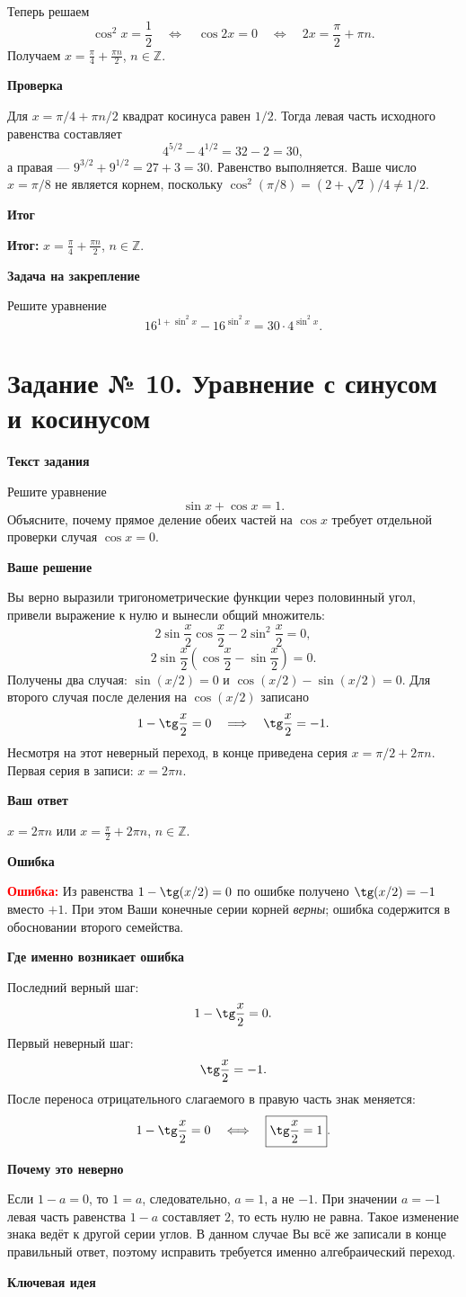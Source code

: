 \documentclass[12pt,a4paper]{article}
\newcommand{\heading}[1]{\par\vspace{4pt}\textbf{#1}\par}
\newcommand{\err}{\textcolor{red}{\textbf{Ошибка:}}}
\newcommand{\result}{\textcolor{teal!60!black}{\textbf{Итог:}}}
\begin{document}
Теперь решаем
\[
\cos^2x=\frac12
\quad\Longleftrightarrow\quad
\cos2x=0
\quad\Longleftrightarrow\quad
2x=\frac\pi2+\pi n.
\]
Получаем $\displaystyle x=\frac\pi4+\frac{\pi n}{2}$, $n\in\mathbb Z$.
\heading{Проверка}
Для $x=\pi/4+\pi n/2$ квадрат косинуса равен $1/2$. Тогда левая часть исходного равенства составляет
\[
4^{5/2}-4^{1/2}=32-2=30,
\]
а правая --- $9^{3/2}+9^{1/2}=27+3=30$. Равенство выполняется.
Ваше число $x=\pi/8$ не является корнем, поскольку $\cos^2(\pi/8)=(2+\sqrt2)/4\ne1/2$.
\heading{Итог}
\result{} $\displaystyle x=\frac\pi4+\frac{\pi n}{2}$, $n\in\mathbb Z$.
\heading{Задача на закрепление}
Решите уравнение
\[
16^{1+\sin^2x}-16^{\sin^2x}=30\cdot4^{\sin^2x}.
\]
\newpage
{}\label{task:10}
\section*{Задание № 10. Уравнение с синусом и косинусом}
\heading{Текст задания}
Решите уравнение
\[
\sin x+\cos x=1.
\]
Объясните, почему прямое деление обеих частей на $\cos x$ требует отдельной проверки случая $\cos x=0$.
\heading{Ваше решение}
Вы верно выразили тригонометрические функции через половинный угол, привели выражение к нулю и вынесли общий множитель:
\[
2\sin\frac x2\cos\frac x2-2\sin^2\frac x2=0,
\]
\[
2\sin\frac x2\left(\cos\frac x2-\sin\frac x2\right)=0.
\]
Получены два случая: $\sin(x/2)=0$ и $\cos(x/2)-\sin(x/2)=0$. Для второго случая после деления на $\cos(x/2)$ записано
\[
1-\tg\frac x2=0
\quad\Longrightarrow\quad
\tg\frac x2=-1.
\]
Несмотря на этот неверный переход, в конце приведена серия $x=\pi/2+2\pi n$. Первая серия в записи: $x=2\pi n$.
\heading{Ваш ответ}
$\displaystyle x=2\pi n$ или $\displaystyle x=\frac\pi2+2\pi n$, $n\in\mathbb Z$.
\heading{Ошибка}
\err{} Из равенства $1-\tg(x/2)=0$ по ошибке получено $\tg(x/2)=-1$ вместо $+1$. При этом Ваши конечные серии корней \emph{верны}; ошибка содержится в обосновании второго семейства.
\heading{Где именно возникает ошибка}
Последний верный шаг:
\[
1-\tg\frac x2=0.
\]
Первый неверный шаг:
\[
\tg\frac x2=-1.
\]
После переноса отрицательного слагаемого в правую часть знак меняется:
\[
1-\tg\frac x2=0
\quad\Longleftrightarrow\quad
\boxed{\tg\frac x2=1}.
\]
\heading{Почему это неверно}
Если $1-a=0$, то $1=a$, следовательно, $a=1$, а не $-1$. При значении $a=-1$ левая часть равенства $1-a$ составляет $2$, то есть нулю не равна. Такое изменение знака ведёт к другой серии углов. В данном случае Вы всё же записали в конце правильный ответ, поэтому исправить требуется именно алгебраический переход.
\heading{Ключевая идея}
\end{document}
